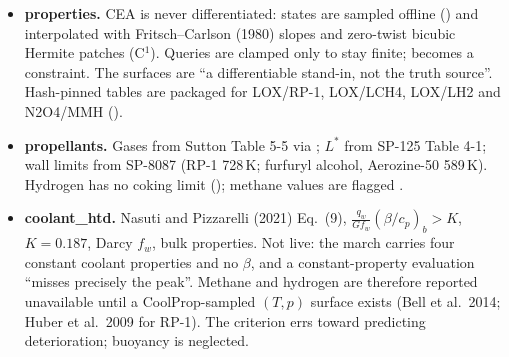 \begin{itemize}
\item \textbf{properties.} CEA is never differentiated: states are sampled offline () and interpolated with Fritsch--Carlson (1980) slopes and zero-twist bicubic Hermite patches (C$^1$). Queries are clamped only to stay finite;  becomes a constraint. The surfaces are ``a differentiable stand-in, not the truth source''. Hash-pinned tables are packaged for LOX/RP-1, LOX/LCH4, LOX/LH2 and N2O4/MMH ().
\item \textbf{propellants.} Gases from Sutton Table 5-5 via ; $L^*$ from SP-125 Table 4-1; wall limits from SP-8087 (RP-1 728\,K; furfuryl alcohol, Aerozine-50 589\,K). Hydrogen has no coking limit (); methane values are flagged .
\item \textbf{coolant\_htd.} Nasuti and Pizzarelli (2021) Eq.~(9), $\frac{q_w}{G f_w}(\beta/c_p)_b>K$, $K=0.187$, Darcy $f_w$, bulk properties. Not live: the march carries four constant coolant properties and no $\beta$, and a constant-property evaluation ``misses precisely the peak''. Methane and hydrogen are therefore reported unavailable until a CoolProp-sampled $(T,p)$ surface exists (Bell et al.\ 2014; Huber et al.\ 2009 for RP-1). The criterion errs toward predicting deterioration; buoyancy is neglected.
\end{itemize}

